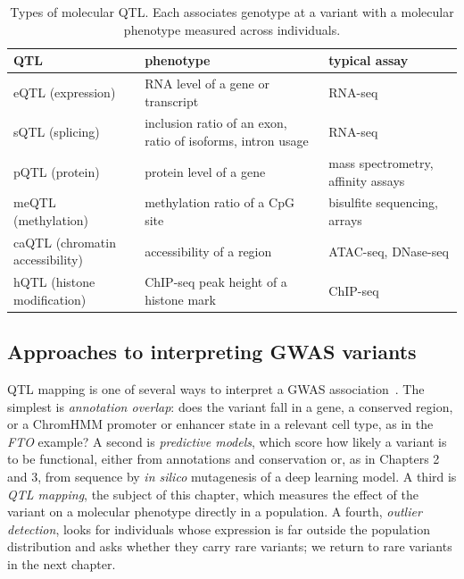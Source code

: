 \begin{table}[!htbp]
  \centering
  \caption{Types of molecular QTL. Each associates genotype at a variant with a molecular phenotype measured across individuals.}
  \label{tab:qtl_types}
  \small
  \begin{tabular}{p{3.6cm}p{5.6cm}p{3.6cm}}
    \toprule
    QTL & phenotype & typical assay \\
    \midrule
    eQTL (expression) & RNA level of a gene or transcript & RNA-seq \\
    sQTL (splicing) & inclusion ratio of an exon, ratio of isoforms, intron usage & RNA-seq \\
    pQTL (protein) & protein level of a gene & mass spectrometry, affinity assays \\
    meQTL (methylation) & methylation ratio of a CpG site & bisulfite sequencing, arrays \\
    caQTL (chromatin accessibility) & accessibility of a region & ATAC-seq, DNase-seq \\
    hQTL (histone modification) & ChIP-seq peak height of a histone mark & ChIP-seq \\
    \bottomrule
  \end{tabular}
\end{table}

\subsection{Approaches to interpreting GWAS variants}

QTL mapping is one of several ways to interpret a GWAS association~\citep{albert2015}. The simplest is \emph{annotation overlap}: does the variant fall in a gene, a conserved region, or a ChromHMM promoter or enhancer state in a relevant cell type, as in the \textit{FTO} example? A second is \emph{predictive models}, which score how likely a variant is to be functional, either from annotations and conservation or, as in Chapters 2 and 3, from sequence by \emph{in silico} mutagenesis of a deep learning model. A third is \emph{QTL mapping}, the subject of this chapter, which measures the effect of the variant on a molecular phenotype directly in a population. A fourth, \emph{outlier detection}, looks for individuals whose expression is far outside the population distribution and asks whether they carry rare variants; we return to rare variants in the next chapter.

